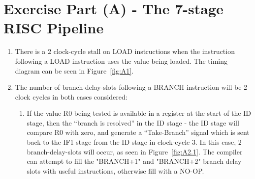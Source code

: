 \section*{Exercise Part (A) - The 7-stage RISC Pipeline}

\begin{enumerate}[wide, label=(A\arabic*)]

\item 
There is a 2 clock-cycle stall on LOAD instructions when the instruction following a LOAD instruction uses the value being loaded. The timing diagram can be seen in Figure~\ref{fig:A1}.

\item
The number of branch-delay-slots following a BRANCH instruction will be 2 clock cycles in both cases considered:
\begin{enumerate}[wide, label=\arabic*.]
\item If the value R0 being tested is available in a register at the start of the ID stage, then the “branch is resolved” in the ID stage - the ID stage will compare R0 with zero, and generate a “Take-Branch” signal which is sent back to the IF1 stage from the ID stage in clock-cycle 3. In this case, 2 branch-delay-slots will occur, as seen in Figure~\ref{fig:A2.1}. The compiler can attempt to fill the "BRANCH+1" and "BRANCH+2" branch delay slots with useful instructions, otherwise fill with a NO-OP. 


\end{enumerate}
\end{enumerate}
